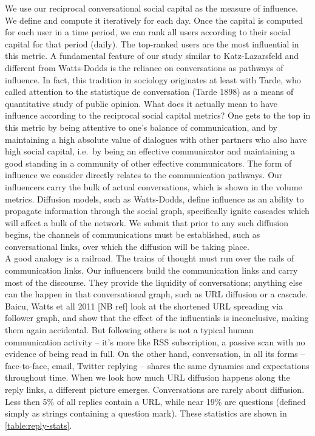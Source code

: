 \documentclass[10pt,oneside]{memoir}
\begin{document}
We use our reciprocal conversational social capital as the measure of influence.  We define and compute it iteratively for each day.  Once the capital is computed for each user in a time period,  we can rank all users according to their social capital for that period (daily).  The top-ranked users are the most influential in this metric.
A fundamental feature of our study similar to Katz-Lazarsfeld and different from Watts-Dodds is the reliance on conversations as pathways of influence.  In fact, this tradition in sociology originates at least with Tarde, who called attention to  the statistique de conversation (Tarde 1898) as a means of quantitative study of public opinion.
What does it actually mean to have influence according to the reciprocal social capital metrics?  One gets to the top in this metric by being attentive to one's balance of communication, and by maintaining a high absolute value of dialogues with other partners who also have high social capital, i.e.\ by being an effective communicator and maintaining a good standing in a community of other effective communicators.
The form of influence we consider directly relates to the communication pathways.  Our influencers carry the bulk of actual conversations, which is shown in the volume metrics.  Diffusion models, such as Watts-Dodds, define influence as an ability to propagate information through the social graph, specifically ignite cascades which will affect a bulk of the network.  We submit that prior to any such diffusion begins, the channels of communications must be established, such as conversational links, over which the diffusion will be taking place. \\
A good analogy is a railroad.  The trains of thought must run over the rails of communication links. Our influencers build the communication links and carry most of the discourse.  They provide the liquidity of conversations; anything else can the happen in that conversational graph, such as URL diffusion or a cascade.   Baicu, Watts et all 2011 [NB ref] look at the shortened URL spreading via follower graph, and show that the effect of the influentials is inconclusive, making them again accidental.  But following others is not a typical human communication activity -- it's more like RSS subscription, a passive scan with no evidence of being read in full.  On the other hand, conversation, in all its forms -- face-to-face, email, Twitter replying -- shares the same dynamics and expectations throughout time.  When we look how much URL diffusion happens along the reply links, a different picture emerges.
Conversations are rarely about diffusion.  Less then 5\% of all replies contain a URL, while near 19\% are questions (defined simply as strings containing a question mark).  These statistics are shown in \ref{table:reply-stats}.
\end{document}
